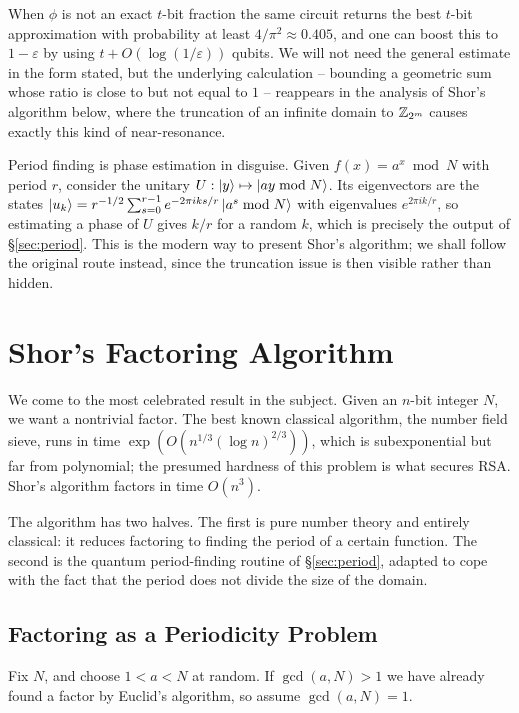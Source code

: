 \documentclass[a4paper]{scrartcl}
\begin{document}
When $\phi$ is not an exact $t$-bit fraction the same circuit returns the best $t$-bit approximation with probability at least $4/\pi^2\approx0.405$, and one can boost this to $1-\varepsilon$ by using $t+O(\log(1/\varepsilon))$ qubits. We will not need the general estimate in the form stated, but the underlying calculation -- bounding a geometric sum whose ratio is close to but not equal to $1$ -- reappears in the analysis of Shor's algorithm below, where the truncation of an infinite domain to $\mathbb{Z}_{2^m}$ causes exactly this kind of near-resonance.

\begin{remark}
	Period finding is phase estimation in disguise. Given $f(x) = a^x \bmod N$ with period $r$, consider the unitary $U:\ket y\mapsto\ket{ay\bmod N}$. Its eigenvectors are the states $\ket{u_k} = r^{-1/2}\sum_{s=0}^{r-1}e^{-2\pi iks/r}\ket{a^s\bmod N}$ with eigenvalues $e^{2\pi ik/r}$, so estimating a phase of $U$ gives $k/r$ for a random $k$, which is precisely the output of \S\ref{sec:period}. This is the modern way to present Shor's algorithm; we shall follow the original route instead, since the truncation issue is then visible rather than hidden.
\end{remark}

\section{Shor's Factoring Algorithm}\label{sec:shor}

We come to the most celebrated result in the subject. Given an $n$-bit integer $N$, we want a nontrivial factor. The best known classical algorithm, the number field sieve, runs in time $\exp\left(O(n^{1/3}(\log n)^{2/3})\right)$, which is subexponential but far from polynomial; the presumed hardness of this problem is what secures RSA. Shor's algorithm factors in time $O(n^3)$.

The algorithm has two halves. The first is pure number theory and entirely classical: it reduces factoring to finding the period of a certain function. The second is the quantum period-finding routine of \S\ref{sec:period}, adapted to cope with the fact that the period does not divide the size of the domain.

\subsection{Factoring as a Periodicity Problem}

Fix $N$, and choose $1 < a < N$ at random. If $\gcd(a,N)>1$ we have already found a factor by Euclid's algorithm, so assume $\gcd(a,N)=1$.
\end{document}
